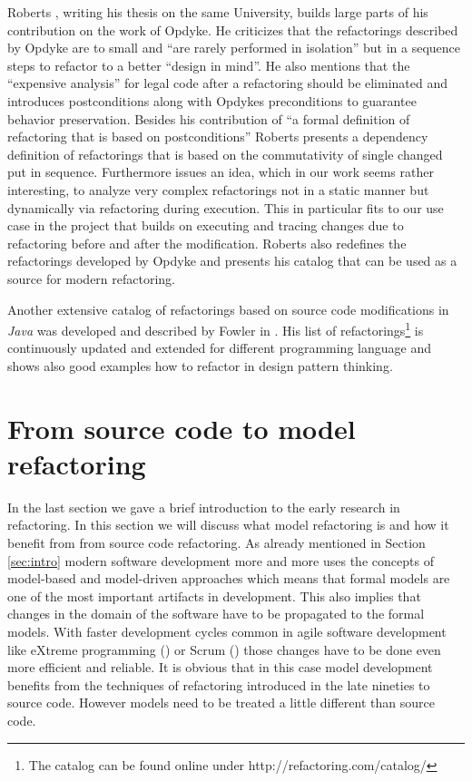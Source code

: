 \documentclass{llncs}
\begin{document}
Roberts \cite{rob99}, writing his thesis on the same University, builds large parts of his contribution on the work of Opdyke. He criticizes that the refactorings described by Opdyke are to small and ``are rarely performed in isolation'' but in a sequence steps to refactor to a better ``design in mind''.  He also mentions that the ``expensive analysis'' for legal code after a refactoring should be eliminated and introduces postconditions along with Opdykes preconditions to guarantee behavior preservation. Besides his contribution of ``a formal definition of refactoring that is based on postconditions'' Roberts presents a dependency definition of refactorings that is based on the commutativity of single changed put in sequence. Furthermore issues an idea, which in our work seems rather interesting, to analyze very complex refactorings not in a static manner but dynamically via refactoring during execution. This in particular fits to our use case in the project that builds on executing and tracing changes due to refactoring before and after the modification. Roberts also redefines the refactorings developed by Opdyke and presents his catalog that can be used as a source for modern refactoring. 

Another extensive catalog of refactorings based on source code modifications in \textit{Java} was developed and described by Fowler in \cite{fow99}. His list of refactorings\footnote{The catalog can be found online under http://refactoring.com/catalog/} is continuously updated and extended for different programming language and shows also good examples how to refactor in design pattern thinking.

\section{From source code to model refactoring}
\label{sec:fromto}

In the last section we gave a brief introduction to the early research in refactoring. In this section we will discuss what model refactoring is and how it benefit from from source code refactoring. As already mentioned in Section \ref{sec:intro} modern software development more and more uses the concepts of model-based and model-driven approaches which means that formal models are one of the most important artifacts in development. This also implies that changes in the domain of the software have to be propagated to the formal models. With faster development cycles common in agile software development like eXtreme programming (\cite{DBLP:journals/computer/Beck99}) or Scrum (\cite{DBLP:journals/software/RisingJ00}) those changes have to be done even more efficient and reliable. It is obvious that in this case model development benefits from the techniques of refactoring introduced in the late nineties to source code. However models need to be treated a little different than source code.
\end{document}
